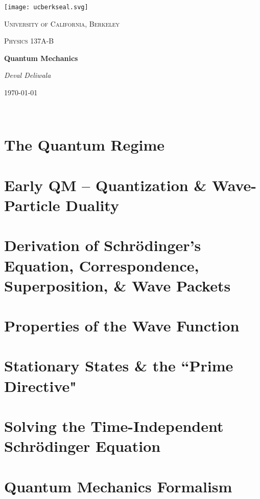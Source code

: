 \documentclass[10pt,letterpaper, twocolumn]{report}
\begin{document}
\begin{titlepage}
	\centering
	\texttt{[image: ucberkseal.svg]}\par\vspace{1cm}
	{\LARGE \textsc{University of California, Berkeley}\par}
	\vspace{1cm}
	{\Large \textsc{Physics 137A-B}\par}
	\vspace{1.5cm}
	{\huge\bfseries Quantum Mechanics \par}
	\vspace{2cm}
	{\Large\itshape Deval Deliwala\par}
	\vfill
	\vfill
	{\large \today\par}
\end{titlepage}

\newpage\
\newpage\
\tableofcontents
\newpage\

\chapter{The Quantum Regime}

\chapter{Early QM -- Quantization \& Wave-Particle Duality}

\chapter{Derivation of Schr\"odinger's Equation, Correspondence, Superposition,
\& Wave Packets}

\chapter{Properties of the Wave Function}

\chapter{Stationary States \& the ``Prime Directive"}

\chapter{Solving the Time-Independent Schr\"odinger Equation}

\chapter{Quantum Mechanics Formalism} 

\end{document}
